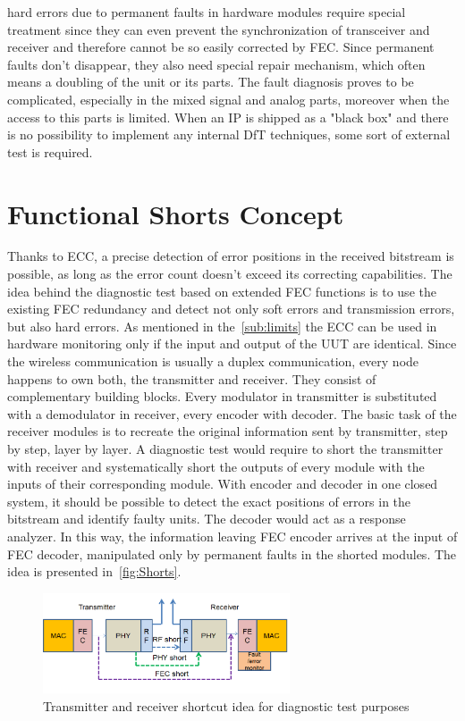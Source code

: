 hard errors due to permanent faults in hardware modules require special treatment since they can even prevent the synchronization of transceiver and receiver and therefore cannot be so easily corrected by FEC. Since permanent faults don't disappear, they also need special repair mechanism, which often means a doubling of the unit or its parts. The fault diagnosis proves to be complicated, especially in the mixed signal and analog parts, moreover when the access to this parts is limited. When an IP is shipped as a "black box" and there is no possibility to implement any internal DfT techniques, some sort of external test is required. 



\section{Functional Shorts Concept}
Thanks to ECC, a precise detection of error positions in the received bitstream is possible, as long as the error count doesn't exceed its correcting capabilities. The idea behind the diagnostic test based on extended FEC functions is to use the existing FEC redundancy and detect not only soft errors and transmission errors, but also hard errors. As mentioned in the~\autoref{sub:limits} the ECC can be used in hardware monitoring only if the input and output of the UUT are identical. Since the wireless communication is usually a duplex communication, every node happens to own both, the transmitter and receiver. They consist of complementary building blocks. Every modulator in transmitter is substituted with a demodulator in receiver, every encoder with decoder. The basic task of the receiver modules is to recreate the original information sent by transmitter, step by step, layer by layer. A diagnostic test would require to short the transmitter with receiver and systematically short the outputs of every module with the inputs of their corresponding module. With encoder and decoder in one closed system, it should be possible to detect the exact positions of errors in the bitstream and identify faulty units. The decoder would act as a response analyzer. In this way, the information leaving FEC encoder arrives at the input of FEC decoder, manipulated only by permanent faults in the shorted modules. The idea is presented in~\autoref{fig:Shorts}. 

\begin{figure}[h]
\centering
\includegraphics[width=0.65\textwidth]{figures/Shorts.png}
\caption{Transmitter and receiver shortcut idea for diagnostic test purposes}
\label{fig:Shorts}
\end{figure}

